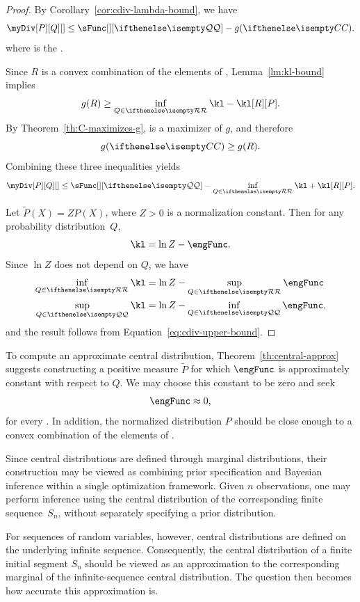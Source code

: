 \begin{proof}
    By Corollary~\ref{cor:cdiv-lambda-bound}, we have
    \[
        \myDiv[P][Q][] \leq \sFunc[][\setQ] - g(\cDist).
    \]
    where \cDist is the \cd.

    Since $R$ is a convex combination of the elements of , Lemma~\ref{lm:kl-bound} implies
    \[
        g(R) \geq \infR \kl - \kl[R][P].
    \]
    By Theorem~\ref{th:C-maximizes-g}, \cDist is a maximizer of $g$, and therefore
    \[
        g(\cDist) \geq g(R).
    \]
    Combining these three inequalities yields
    \begin{equation} \label{eq:cdiv-upper-bound}
        \myDiv[P][Q][]  \leq \sFunc[][\setQ] - \infR \kl + \kl[R][P].
    \end{equation}

    Let $\tilde{P}(X) = Z P(X)$, where $Z > 0$ is a normalization constant.
    Then for any probability distribution~$Q$,
    \[
        \kl = \ln Z - \engFunc.
    \]
    Since $\ln Z$ does not depend on $Q$, we have
    \begin{align*}
        \infR \kl &= \ln Z - \supR \engFunc \\
        \sup_{\inSet{Q}} \kl &= \ln Z - \inf_{\inSet{Q}} \engFunc,
    \end{align*}
    and the result follows from Equation~\ref{eq:cdiv-upper-bound}.
\end{proof}

To compute an approximate central distribution, Theorem~\ref{th:central-approx} suggests constructing a positive
measure $\tilde P$ for which $\engFunc$ is approximately constant with respect to $Q$.
We may choose this constant to be zero and seek
\[
    \engFunc \approx 0,
\]
for every .
In addition, the normalized distribution $P$ should be close enough to a convex combination of the elements of \setQ.

Since central distributions are defined through marginal distributions, their construction may be viewed as
combining prior specification and Bayesian inference within a single optimization framework.
Given $n$ observations, one may perform inference using the central distribution of the corresponding finite
sequence~$S_n$, without separately specifying a prior distribution.

For sequences of random variables, however, central distributions are defined on the
underlying infinite sequence.
Consequently, the central distribution of a finite initial segment $S_n$ should be viewed as an approximation to the
corresponding marginal of the infinite-sequence central distribution.
The question then becomes how accurate this approximation is.

